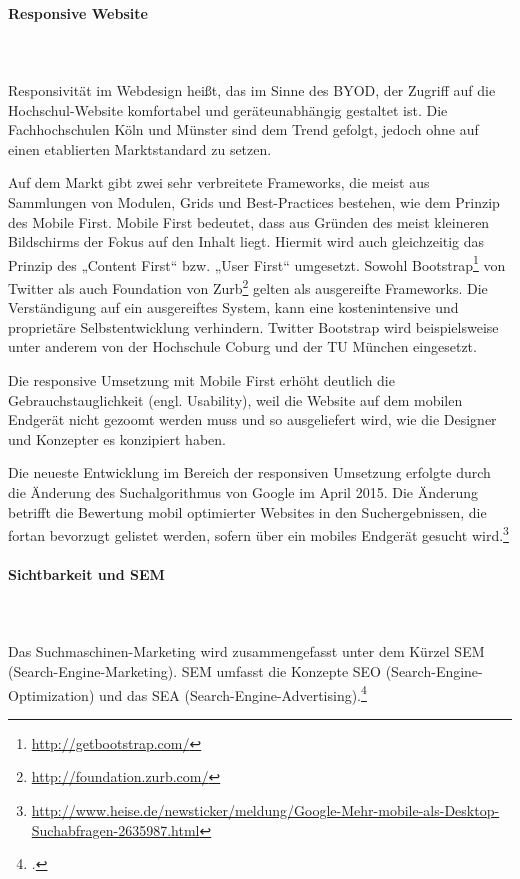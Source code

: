 \paragraph{Responsive Website}\mbox{}\\\\
Responsivität im Webdesign heißt, das im Sinne des BYOD, der Zugriff auf die Hochschul-Website komfortabel und geräteunabhängig gestaltet ist. Die Fachhochschulen Köln und Münster sind dem Trend gefolgt, jedoch ohne auf einen etablierten Marktstandard zu setzen.

Auf dem Markt gibt zwei sehr verbreitete Frameworks, die meist aus Sammlungen von Modulen, Grids und Best-Practices bestehen, wie dem Prinzip des Mobile First. Mobile First bedeutet, dass aus Gründen des meist kleineren Bildschirms der Fokus auf den Inhalt liegt. Hiermit wird auch gleichzeitig das Prinzip des „Content First“ bzw. „User First“ umgesetzt. Sowohl Bootstrap\footnote{\url{http://getbootstrap.com/}} von Twitter als auch Foundation von Zurb\footnote{\url{http://foundation.zurb.com/}} gelten als ausgereifte Frameworks. Die Verständigung auf ein ausgereiftes System, kann eine kostenintensive und proprietäre Selbstentwicklung verhindern. Twitter Bootstrap wird beispielsweise unter anderem von der Hochschule Coburg und der TU München eingesetzt.

Die responsive Umsetzung mit Mobile First erhöht deutlich die Gebrauchstauglichkeit (engl. Usability), weil die Website auf dem mobilen Endgerät nicht gezoomt werden muss und so ausgeliefert wird, wie die Designer und Konzepter es konzipiert haben.

Die neueste Entwicklung im Bereich der responsiven Umsetzung erfolgte durch die Änderung des Suchalgorithmus von Google im April 2015. Die Änderung betrifft die Bewertung mobil optimierter Websites in den Suchergebnissen, die fortan bevorzugt gelistet werden, sofern über ein mobiles Endgerät gesucht wird.\footnote{\url{http://www.heise.de/newsticker/meldung/Google-Mehr-mobile-als-Desktop-Suchabfragen-2635987.html}}


\paragraph{Sichtbarkeit und SEM}\mbox{}\\\\ 
Das Suchmaschinen-Marketing wird zusammengefasst unter dem Kürzel SEM (Search-Engine-Marketing). SEM umfasst die Konzepte SEO (Search-Engine-Optimization) und das SEA (Search-Engine-Advertising).\footcite[Vgl.][83]{kr_ru_wiba_2015}

